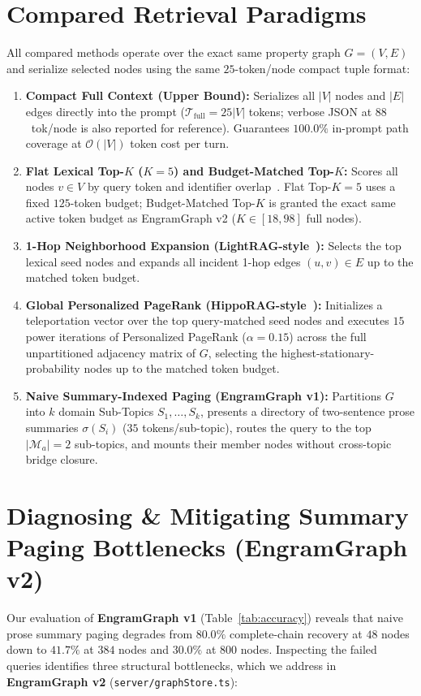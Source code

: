 \documentclass[10pt]{article}
\begin{document}
\section{Compared Retrieval Paradigms}
All compared methods operate over the exact same property graph $G=(V,E)$ and serialize selected nodes using the same $25$-token/node compact tuple format:
\begin{enumerate}
  \setlength{\itemsep}{2pt}\setlength{\parskip}{0pt}
  \item \textbf{Compact Full Context (Upper Bound):} Serializes all $|V|$ nodes and $|E|$ edges directly into the prompt ($\mathcal{T}_{\mathrm{full}} = 25|V|$ tokens; verbose JSON at $88$~tok/node is also reported for reference). Guarantees $100.0\%$ in-prompt path coverage at $\mathcal{O}(|V|)$ token cost per turn.
  \item \textbf{Flat Lexical Top-$K$ ($K=5$) and Budget-Matched Top-$K$:} Scores all nodes $v \in V$ by query token and identifier overlap~\cite{chhikara2025mem0}. Flat Top-$K=5$ uses a fixed $125$-token budget; Budget-Matched Top-$K$ is granted the exact same active token budget as EngramGraph v2 ($K \in [18, 98]$ full nodes).
  \item \textbf{1-Hop Neighborhood Expansion (LightRAG-style~\cite{guo2024lightrag}):} Selects the top lexical seed nodes and expands all incident 1-hop edges $(u,v) \in E$ up to the matched token budget.
  \item \textbf{Global Personalized PageRank (HippoRAG-style~\cite{gutierrez2024hipporag}):} Initializes a teleportation vector over the top query-matched seed nodes and executes $15$ power iterations of Personalized PageRank ($\alpha = 0.15$) across the full unpartitioned adjacency matrix of $G$, selecting the highest-stationary-probability nodes up to the matched token budget.
  \item \textbf{Naive Summary-Indexed Paging (EngramGraph v1):} Partitions $G$ into $k$ domain Sub-Topics $S_1, \dots, S_k$, presents a directory of two-sentence prose summaries $\sigma(S_i)$ ($35$ tokens/sub-topic), routes the query to the top $|\mathcal{M}_a|=2$ sub-topics, and mounts their member nodes without cross-topic bridge closure.
\end{enumerate}

\section{Diagnosing \& Mitigating Summary Paging Bottlenecks (EngramGraph v2)}
Our evaluation of \textbf{EngramGraph v1} (Table~\ref{tab:accuracy}) reveals that naive prose summary paging degrades from $80.0\%$ complete-chain recovery at $48$ nodes down to $41.7\%$ at $384$ nodes and $30.0\%$ at $800$ nodes. Inspecting the failed queries identifies three structural bottlenecks, which we address in \textbf{EngramGraph v2} (\texttt{server/graphStore.ts}):
\end{document}
